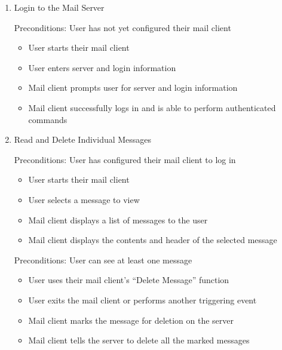 \documentclass[a4paper,12pt]{article}
\begin{document}
\begin{enumerate}

\item Login to the Mail Server

Preconditions: User has not yet configured their mail client

  \begin{multicols}{2}
    \begin{itemize}
    \item User starts their mail client
      \\
    \item User enters server and login information
      \vfill \columnbreak
    \item Mail client prompts user for server and login information
    \item Mail client successfully logs in and is able to perform authenticated commands
    \end{itemize}
  \end{multicols}


\item Read and Delete Individual Messages

Preconditions: User has configured their mail client to log in

  \begin{multicols}{2}
    \begin{itemize}
    \item User starts their mail client
      \\
    \item User selects a message to view
      \vfill \columnbreak
    \item Mail client displays a list of messages to the user
    \item Mail client displays the contents and header of the selected message
    \end{itemize}
  \end{multicols}

Preconditions: User can see at least one message

  \begin{multicols}{2}
    \begin{itemize}
    \item User uses their mail client's ``Delete Message'' function
      \\
    \item User exits the mail client or performs another triggering event
      \vfill \columnbreak
    \item Mail client marks the message for deletion on the server
    \item Mail client tells the server to delete all the marked messages
    \end{itemize}
  \end{multicols}


\end{enumerate}
\end{document}
